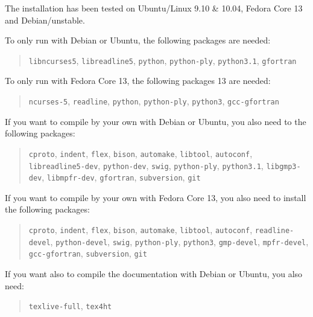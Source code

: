 \documentclass[a4paper]{article}
\begin{document}
The installation has been tested on Ubuntu/Linux 9.10 \& 10.04,
Fedora Core 13 and Debian/unstable.

To only run \Apfa with Debian or Ubuntu, the following packages are needed:
\begin{quote}
  \texttt{libncurses5}, \texttt{libreadline5}, \texttt{python},
  \texttt{python-ply}, \texttt{python3.1}, \texttt{gfortran}
\end{quote}

To only run \Apfa with Fedora Core 13, the following packages 13 are needed:
\begin{quote}
  \texttt{ncurses-5}, \texttt{readline}, \texttt{python},
  \texttt{python-ply}, \texttt{python3}, \texttt{gcc-gfortran}
\end{quote}


If you want to compile \Apfa by your own with Debian or Ubuntu, you also 
need to the following packages:
\begin{quote}
  \texttt{cproto}, \texttt{indent}, \texttt{flex}, \texttt{bison},
  \texttt{automake}, \texttt{libtool}, \texttt{autoconf},
  \texttt{libreadline5-dev}, \texttt{python-dev}, \texttt{swig},
  \texttt{python-ply}, \texttt{python3.1}, \texttt{libgmp3-dev},
  \texttt{libmpfr-dev}, \texttt{gfortran}, \texttt{subversion},
  \texttt{git}
\end{quote}

If you want to compile \Apfa by your own with Fedora Core 13, you also
need to install the following packages:
\begin{quote}
  \texttt{cproto}, \texttt{indent}, \texttt{flex}, \texttt{bison},
  \texttt{automake}, \texttt{libtool}, \texttt{autoconf},
  \texttt{readline-devel}, \texttt{python-devel}, \texttt{swig},
  \texttt{python-ply}, \texttt{python3}, \texttt{gmp-devel},
  \texttt{mpfr-devel}, \texttt{gcc-gfortran}, \texttt{subversion},
  \texttt{git}
\end{quote}


If you want also to compile the documentation with Debian or Ubuntu, you 
also need:
\begin{quote}
  \texttt{texlive-full}, \texttt{tex4ht}
\end{quote}
\end{document}
